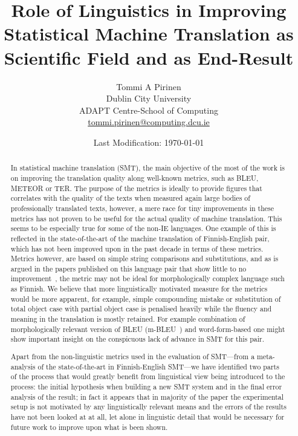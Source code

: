 \documentclass[preprint]{flammie}
\title{Role of Linguistics in Improving Statistical Machine Translation as
Scientific Field and as End-Result}
\author{Tommi A Pirinen\\
Dublin City University\\
ADAPT Centre-School of Computing\\
\url{tommi.pirinen@computing.dcu.ie}}
\date{Last Modification: \today}
\begin{document}
\maketitle

\begin{abstract}
    In statistical machine translation (SMT), the main objective of the most of
    the work is on improving the translation quality along well-known metrics,
    such as BLEU, METEOR or TER. The purpose of the metrics is ideally to
    provide figures that correlates with the quality of the texts when measured
    again large bodies of professionally translated texts, however, a mere race
    for tiny improvements in these metrics has not proven to be useful for the
    actual quality of machine translation. This seems to be especially true for
    some of the non-IE languages. One example of this is reflected in the
    state-of-the-art of the machine translation of Finnish-English pair, which
    has not been improved upon in the past decade in terms of these metrics.
    Metrics however, are based on simple string comparisons and substitutions,
    and as is argued in the papers published on this language pair that show little to no
    improvement~\cite{clifton2011combining,luong2010hybrid,virpioja2007morphology},
    the metric may not be ideal for morphologically complex language such as
    Finnish. We believe that more linguistically motivated measure for the
    metrics would be more apparent, for example, simple compounding mistake or
    substitution of total object case with partial object case is penalised
    heavily while the fluency and meaning in the translation is mostly
    retained. For example combination of morphologically relevant version of
    BLEU (m-BLEU~\cite{luong2010hybrid}) and word-form-based one might show important insight on the
    conspicuous lack of advance in SMT for this pair. 

    Apart from the non-linguistic metrics used in the evaluation of SMT---from
    a meta-analysis of the state-of-the-art in Finnish-English SMT---we have
    identified two parts of the process that would greatly benefit from
    linguistical view being introduced to the process: the initial hypothesis
    when building a new SMT system and in the final error analysis of the
    result; in fact it appears that in majority of the paper the experimental
    setup is not motivated by any linguistically relevant means and the errors
    of the results have not been looked at at all, let alone in linguistic
    detail that would be necessary for future work to improve upon what is been
    shown.
\end{abstract}




\end{document}
